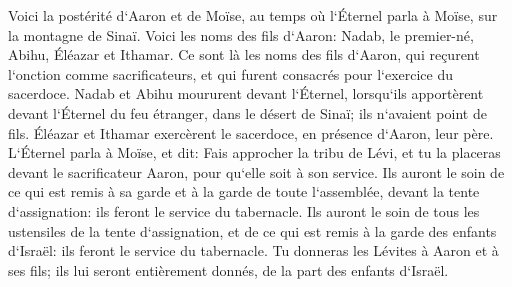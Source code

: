 \verse Voici la postérité d`Aaron et de Moïse, au temps où l`Éternel parla à Moïse, sur la montagne de Sinaï. 
\verse Voici les noms des fils d`Aaron: Nadab, le premier-né, Abihu, Éléazar et Ithamar. 
\verse Ce sont là les noms des fils d`Aaron, qui reçurent l`onction comme sacrificateurs, et qui furent consacrés pour l`exercice du sacerdoce. 
\verse Nadab et Abihu moururent devant l`Éternel, lorsqu`ils apportèrent devant l`Éternel du feu étranger, dans le désert de Sinaï; ils n`avaient point de fils. Éléazar et Ithamar exercèrent le sacerdoce, en présence d`Aaron, leur père. 
\verse L`Éternel parla à Moïse, et dit: 
\verse Fais approcher la tribu de Lévi, et tu la placeras devant le sacrificateur Aaron, pour qu`elle soit à son service. 
\verse Ils auront le soin de ce qui est remis à sa garde et à la garde de toute l`assemblée, devant la tente d`assignation: ils feront le service du tabernacle. 
\verse Ils auront le soin de tous les ustensiles de la tente d`assignation, et de ce qui est remis à la garde des enfants d`Israël: ils feront le service du tabernacle. 
\verse Tu donneras les Lévites à Aaron et à ses fils; ils lui seront entièrement donnés, de la part des enfants d`Israël. 
